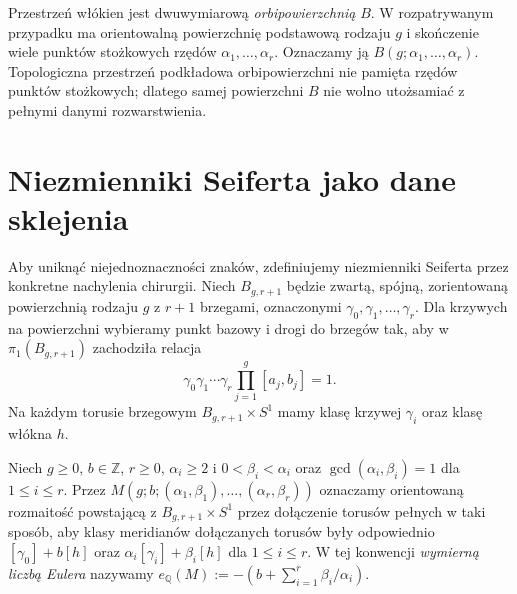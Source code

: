 Przestrzeń włókien jest dwuwymiarową \emph{orbipowierzchnią}
$B$. W rozpatrywanym przypadku ma orientowalną powierzchnię
podstawową rodzaju $g$ i skończenie wiele punktów stożkowych
rzędów $\alpha_1,\ldots,\alpha_r$. Oznaczamy ją
$B(g;\alpha_1,\ldots,\alpha_r)$. Topologiczna
przestrzeń podkładowa orbipowierzchni nie pamięta rzędów
punktów stożkowych; dlatego samej powierzchni $B$ nie wolno
utożsamiać z pełnymi danymi rozwarstwienia.

\begin{center}
\end{center}

\section{Niezmienniki Seiferta jako dane sklejenia}
\label{sec:tg-seifert-gluing}

Aby uniknąć niejednoznaczności znaków, zdefiniujemy
niezmienniki Seiferta przez konkretne nachylenia chirurgii.
Niech $B_{g,r+1}$ będzie zwartą, spójną, zorientowaną
powierzchnią rodzaju $g$ z $r+1$ brzegami, oznaczonymi
$\gamma_0,\gamma_1,\ldots,\gamma_r$.
Dla krzywych na powierzchni wybieramy punkt bazowy i drogi
do brzegów tak, aby w $\pi_1(B_{g,r+1})$ zachodziła relacja
\[
\gamma_0\gamma_1\cdots\gamma_r
\prod_{j=1}^g[a_j,b_j]=1.
\]
Na każdym torusie brzegowym $B_{g,r+1}\times S^1$ mamy
klasę krzywej $\gamma_i$ oraz klasę włókna $h$.

\begin{definicja}
Niech $g\geq0$, $b\in\mathbb Z$, $r\geq0$,
$\alpha_i\geq2$ i $0<\beta_i<\alpha_i$ oraz
$\gcd(\alpha_i,\beta_i)=1$ dla $1\leq i\leq r$.
Przez
$M(g;b;(\alpha_1,\beta_1),\ldots,(\alpha_r,\beta_r))$
oznaczamy orientowaną rozmaitość powstającą z
$B_{g,r+1}\times S^1$ przez dołączenie torusów pełnych
w taki sposób, aby klasy meridianów dołączanych torusów
były odpowiednio
$[\gamma_0]+b[h]$ oraz
$\alpha_i[\gamma_i]+\beta_i[h]$ dla $1\leq i\leq r$.
W tej konwencji \emph{wymierną liczbą Eulera} nazywamy
$e_{\mathbb Q}(M):=-(b+\sum_{i=1}^r\beta_i/\alpha_i)$.
\end{definicja}

